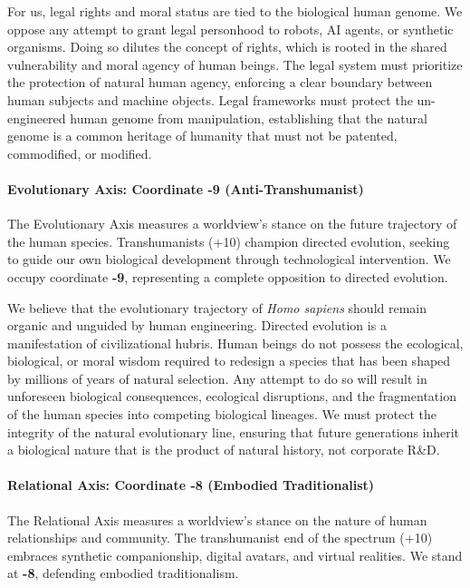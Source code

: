 For us, legal rights and moral status are tied to the biological human
genome. We oppose any attempt to grant legal personhood to robots, AI
agents, or synthetic organisms. Doing so dilutes the concept of rights,
which is rooted in the shared vulnerability and moral agency of human
beings. The legal system must prioritize the protection of natural human
agency, enforcing a clear boundary between human subjects and machine
objects. Legal frameworks must protect the un-engineered human genome
from manipulation, establishing that the natural genome is a common
heritage of humanity that must not be patented, commodified, or
modified.

\paragraph{Evolutionary Axis: Coordinate -9
(Anti-Transhumanist)}\label{evolutionary-axis-coordinate--9-anti-transhumanist}

The Evolutionary Axis measures a worldview's stance on the future
trajectory of the human species. Transhumanists (+10) champion directed
evolution, seeking to guide our own biological development through
technological intervention. We occupy coordinate \textbf{-9},
representing a complete opposition to directed evolution.

We believe that the evolutionary trajectory of \emph{Homo sapiens}
should remain organic and unguided by human engineering. Directed
evolution is a manifestation of civilizational hubris. Human beings do
not possess the ecological, biological, or moral wisdom required to
redesign a species that has been shaped by millions of years of natural
selection. Any attempt to do so will result in unforeseen biological
consequences, ecological disruptions, and the fragmentation of the human
species into competing biological lineages. We must protect the
integrity of the natural evolutionary line, ensuring that future
generations inherit a biological nature that is the product of natural
history, not corporate R\&D.

\paragraph{Relational Axis: Coordinate -8 (Embodied
Traditionalist)}\label{relational-axis-coordinate--8-embodied-traditionalist}

The Relational Axis measures a worldview's stance on the nature of human
relationships and community. The transhumanist end of the spectrum (+10)
embraces synthetic companionship, digital avatars, and virtual
realities. We stand at \textbf{-8}, defending embodied traditionalism.

